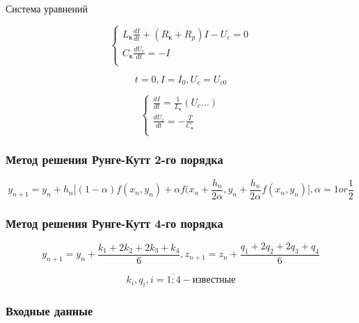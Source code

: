 Система уравнений

\begin{equation*}
    \begin{cases}
        L_\text{к}\frac{dI}{dt} + (R_\text{к} + R_p) I - U_c = 0 \\
        C_\text{к} \frac{dU_c}{dt} = -I \\
    \end{cases}
\end{equation*}

\begin{equation*}
    t = 0, I = I_0, U_c = U_{c0}
\end{equation*}

\begin{equation*}
    \begin{cases}
        \frac{dI}{dt} = \frac{1}{L_\text{к}} (U_c...) \\
        \frac{dU_c}{dt} = -\frac{T}{C_\text{к}} \\
    \end{cases}
\end{equation*}

\subsubsection{Метод решения Рунге-Кутт 2-го порядка}

\begin{equation*}
    y_{n+1} = y_n + h_n \bigg[ (1-\alpha) f(x_n, y_n) +
        \alpha f(x_n + \frac{h_n}{2\alpha},
    y_n + \frac{h_n}{2\alpha} f(x_n, y_n) \bigg],
    \alpha = 1 or \frac{1}{2}
\end{equation*}

\subsubsection{Метод решения Рунге-Кутт 4-го порядка}

\begin{equation*}
    y_{n+1} = y_n + \frac{k_1 + 2k_2+2k_3+k_4}{6},
    z_{n+1} = z_n + \frac{q_1 + 2q_2 + 2q_3 + q_4}{6}
\end{equation*}

\begin{equation*}
    k_i, q_i, i = \overline{1;4} - \text{известные}
\end{equation*}

\subsubsection{Входные данные}

